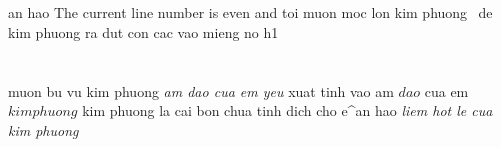 \begin{num vu kim phuong}
an hao The current line number is even and toi muon moc lon kim phuong
$\frac{}{}$
de kim phuong ra dut con cac vao mieng no h1
\section{}
\begin{}
    
\end{}
muon bu vu kim phuong
	\textit{am dao cua em yeu}
xuat tinh vao am $dao$ cua em $kim phuong$
kim phuong la cai bon chua tinh dich cho e^{an hao}
	\textit{liem hot le cua kim phuong}
\end{num vu kim phuong}
